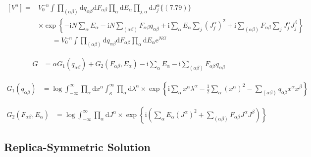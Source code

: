 \documentclass{article}
\begin{document}
\begin{align*}
{\left[V^{n}\right]=} & V_{0}^{-n} \int \prod_{(\alpha \beta)} \mathrm{d} q_{\alpha \beta} \mathrm{d} F_{\alpha \beta} \prod_{\alpha} \mathrm{d} E_{\alpha} \prod_{j, \alpha} \mathrm{d} J_{j}^{\alpha}\{(7.79)\} \\
& \times \exp \left\{-\mathrm{i} N \sum_{\alpha} E_{\alpha} -\mathrm{i} N \sum_{(\alpha \beta)} F_{\alpha \beta} q_{\alpha \beta}+\mathrm{i} \sum_{\alpha} E_{\alpha} \sum_{j}\left(J_{j}^{\alpha}\right)^{2}+\mathrm{i} \sum_{(\alpha \beta)} F_{\alpha \beta} \sum_{j} J_{j}^{\alpha} J_{j}^{\beta}\right\} \\
& \qquad =V_{0}^{-n} \int \prod_{(\alpha \beta)} \mathrm{d} q_{\alpha \beta} \mathrm{d} F_{\alpha \beta} \prod_{\alpha} \mathrm{d} E_{\alpha} \mathrm{e}^{N G}\tag{7.80}
\end{align*}

\begin{align*}
G &= \alpha G_1(q_{\alpha \beta}) + G_2(F_{\alpha \beta}, E_{\alpha}) - \mathrm{i} \sum_{\alpha} E_{\alpha} - \mathrm{i} \sum_{(\alpha \beta)} F_{\alpha \beta} q_{\alpha \beta}
\tag{7.81}
\end{align*}

\begin{align*}
G_1(q_{\alpha \beta}) &= \log \int_{-\infty}^{\infty} \prod_{\alpha} \mathrm{d} x^{\alpha} \int_{\kappa}^{\infty} \prod_{\alpha} \mathrm{d} \lambda^{\alpha}  \times \exp\left\{ \mathrm{i} \sum_{\alpha} x^{\alpha} \lambda^{\alpha} - \frac{1}{2} \sum_{\alpha} (x^{\alpha})^2 - \sum_{(\alpha \beta)} q_{\alpha \beta} x^{\alpha} x^{\beta} \right\}
\tag{7.82}
\end{align*}

\begin{align*}
G_2(F_{\alpha \beta}, E_{\alpha}) &= \log \int_{-\infty}^{\infty} \prod_{\alpha} \mathrm{d} J^{\alpha} \times \exp\left\{ \mathrm{i} \left( \sum_{\alpha} E_{\alpha} (J^{\alpha})^2 + \sum_{(\alpha \beta)} F_{\alpha \beta} J^{\alpha} J^{\beta} \right)\right\}
\tag{7.83}
\end{align*}

\subsection{Replica-Symmetric Solution}
\end{document}
